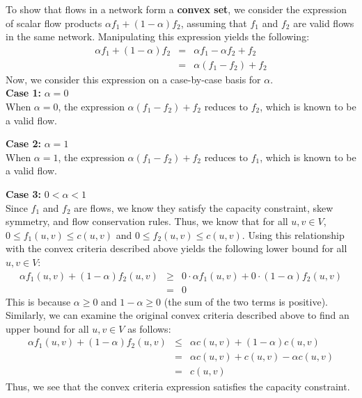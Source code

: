 \documentclass[11pt]{article}
\begin{document}
\begin{sol}

To show that flows in a network form a \textbf{convex set}, we consider the expression of scalar flow products $\alpha f_1 + (1 - \alpha)f_2$, assuming that $f_1$ and $f_2$ are valid flows in the same network. Manipulating this expression yields the following:
\begin{eqnarray}
\alpha f_1 + (1 - \alpha)f_2 & = & \alpha f_1 - \alpha f_2 + f_2 \\
& = & \alpha(f_1 - f_2) + f_2
\end{eqnarray}
Now, we consider this expression on a case-by-case basis for $\alpha$.\\


\textbf{Case 1:} $\alpha = 0$ \\
When $\alpha = 0$, the expression $\alpha(f_1 - f_2) + f_2$ reduces to $f_2$, which is known to be a valid flow. 

\textbf{Case 2:} $\alpha = 1$ \\
When $\alpha = 1$, the expression $\alpha(f_1 - f_2) + f_2$ reduces to $f_1$, which is known to be a valid flow. 

\textbf{Case 3:} $0 < \alpha  < 1$ \\
Since $f_1$ and $f_2$ are flows, we know they satisfy the capacity constraint, skew symmetry, and flow conservation rules. Thus, we know that for all $u,v \in V$, $0 \leq f_1(u,v) \leq c(u,v)$ and $0 \leq f_2(u,v) \leq c(u,v)$. Using this relationship with the convex criteria described above yields the following lower bound for all $u,v \in V$:
\begin{eqnarray*}
\alpha f_1(u,v) + (1 - \alpha)f_2(u,v) & \geq & 0 \cdot \alpha f_1(u,v) + 0 \cdot (1 - \alpha)f_2(u,v) \\
& = & 0
\end{eqnarray*}
This is because $\alpha \geq 0$ and $1 - \alpha \geq 0$ (the sum of the two terms is positive). Similarly, we can examine the original convex criteria described above to find an upper bound for all $u,v \in V$ as follows:
\begin{eqnarray*}
\alpha f_1(u,v) + (1 - \alpha)f_2(u,v) & \leq & \alpha c(u,v) + (1 - \alpha)c(u,v) \\
& = & \alpha c(u,v) + c(u,v) - \alpha c(u,v) \\
& = & c(u,v)
\end{eqnarray*}
Thus, we see that the convex criteria expression satisfies the capacity constraint. 


\end{sol}
\end{document}
